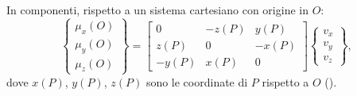 In componenti, rispetto a un sistema cartesiano con origine in $O$:
\begin{equation}\label{eq:momento_matrice}
	\begin{Bmatrix} \mu_x(O) \\ \mu_y(O) \\ \mu_z(O) \end{Bmatrix}
	=
	\begin{bmatrix}
		0    & -z(P) &  y(P) \\
		z(P) &  0    & -x(P) \\
		-y(P) &  x(P) &  0
	\end{bmatrix}
	\begin{Bmatrix} v_x \\ v_y \\ v_z \end{Bmatrix},
\end{equation}
dove $x(P)$, $y(P)$, $z(P)$ sono le coordinate di $P$ rispetto a $O$ ().


